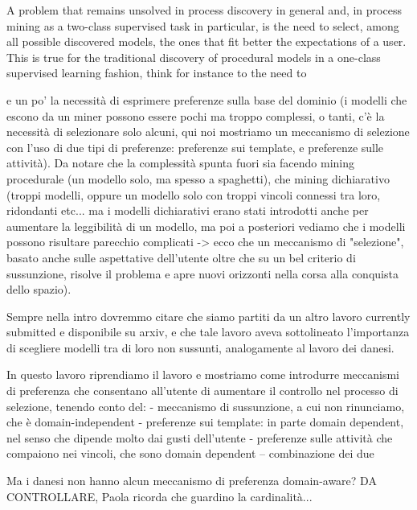 A problem that remains unsolved in process discovery in general and, in process mining as a two-class supervised task in particular, is the need to select, among all possible discovered models, the ones that fit better the expectations of a user. This is true for the traditional discovery of procedural models in a one-class supervised learning fashion, think for instance to the need to    


 


 e un po' la necessità di esprimere preferenze sulla base del dominio (i modelli che escono da un miner possono essere pochi ma troppo complessi, o tanti, c'è la necessità di selezionare solo alcuni, qui noi mostriamo un meccanismo di selezione con l'uso di due tipi di preferenze: preferenze sui template, e preferenze sulle attività). Da notare che la complessità spunta fuori sia facendo mining procedurale (un modello solo, ma spesso a spaghetti), che mining dichiarativo (troppi modelli, oppure un modello solo con troppi vincoli connessi tra loro, ridondanti etc... ma i modelli dichiarativi erano stati introdotti anche per aumentare la leggibilità di un modello, ma poi a posteriori vediamo che i modelli possono risultare parecchio complicati -> ecco che un meccanismo di "selezione", basato anche sulle aspettative dell'utente oltre che su un bel criterio di sussunzione, risolve il problema e apre nuovi orizzonti nella corsa alla conquista dello spazio).

Sempre nella intro dovremmo citare che siamo partiti da un altro lavoro currently submitted e disponibile su arxiv, e che tale lavoro aveva sottolineato l'importanza di scegliere modelli tra di loro non sussunti, analogamente al lavoro dei danesi.

In questo lavoro riprendiamo il lavoro e mostriamo come introdurre meccanismi di preferenza che consentano all'utente di aumentare il controllo nel processo di selezione, tenendo conto del:
- meccanismo di sussunzione, a cui non rinunciamo, che è domain-independent
- preferenze sui template: in parte domain dependent, nel senso che dipende molto dai gusti dell'utente
- preferenze sulle attività che compaiono nei vincoli, che sono domain dependent
-- combinazione dei due

Ma i danesi non hanno alcun meccanismo di preferenza domain-aware? DA CONTROLLARE, Paola ricorda che guardino la cardinalità...